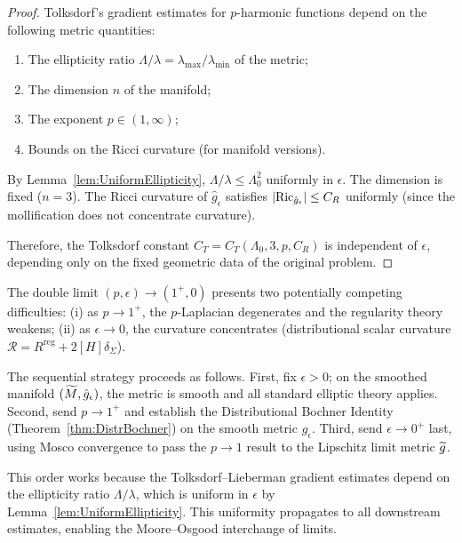 \begin{proof}
Tolksdorf's gradient estimates \cite{tolksdorf1984} for $p$-harmonic functions depend on the following metric quantities:
\begin{enumerate}
    \item The ellipticity ratio $\Lambda/\lambda = \lambda_{\max}/\lambda_{\min}$ of the metric;
    \item The dimension $n$ of the manifold;
    \item The exponent $p \in (1, \infty)$;
    \item Bounds on the Ricci curvature (for manifold versions).
\end{enumerate}

By Lemma~\ref{lem:UniformEllipticity}, $\Lambda/\lambda \le \Lambda_0^2$ uniformly in $\epsilon$. The dimension is fixed ($n = 3$). The Ricci curvature of $\hat{g}_\epsilon$ satisfies $|\mathrm{Ric}_{\hat{g}_\epsilon}| \le C_R$ uniformly (since the mollification does not concentrate curvature).

Therefore, the Tolksdorf constant $C_T = C_T(\Lambda_0, 3, p, C_R)$ is independent of $\epsilon$, depending only on the fixed geometric data of the original problem.
\end{proof}

\begin{remark}
The double limit $(p, \epsilon) \to (1^+, 0)$ presents two potentially competing difficulties: (i) as $p \to 1^+$, the $p$-Laplacian degenerates and the regularity theory weakens; (ii) as $\epsilon \to 0$, the curvature concentrates (distributional scalar curvature $\mathcal{R} = R^{\mathrm{reg}} + 2[H]\delta_\Sigma$).

The sequential strategy proceeds as follows. First, fix $\epsilon > 0$; on the smoothed manifold $(\widetilde{M}, \hat{g}_\epsilon)$, the metric is smooth and all standard elliptic theory applies. Second, send $p \to 1^+$ and establish the Distributional Bochner Identity (Theorem~\ref{thm:DistrBochner}) on the smooth metric $\hat{g}_\epsilon$. Third, send $\epsilon \to 0^+$ last, using Mosco convergence to pass the $p \to 1$ result to the Lipschitz limit metric $\widetilde{g}$.

This order works because the Tolksdorf--Lieberman gradient estimates depend on the ellipticity ratio $\Lambda/\lambda$, which is uniform in $\epsilon$ by Lemma~\ref{lem:UniformEllipticity}. This uniformity propagates to all downstream estimates, enabling the Moore--Osgood interchange of limits.
\end{remark}

